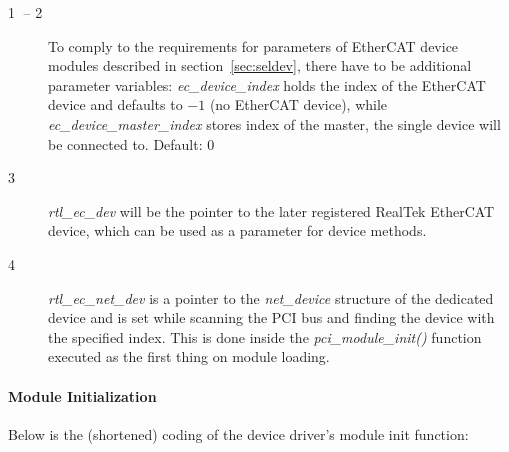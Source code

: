 \documentclass[a4paper,12pt,BCOR6mm,bibtotoc,idxtotoc]{scrbook}
\newcommand{\linenum}[1]{\normalfont\textcircled{\tiny #1}}
\begin{document}
\begin{description}
\item[\linenum{1} -- \linenum{2}] To
  comply to the requirements for parameters of EtherCAT device modules
  described in section~\ref{sec:seldev}, there have to be additional
  parameter variables: \textit{ec\_\-device\_\-index} holds the index
  of the EtherCAT device and defaults to $-1$ (no EtherCAT device),
  while \textit{ec\_device\_master\_index} stores index of the master,
  the single device will be connected to. Default: $0$
\item[\linenum{3}] \textit{rtl\_ec\_dev} will be
  the pointer to the later registered RealTek EtherCAT device, which
  can be used as a parameter for device methods.
\item[\linenum{4}] \textit{rtl\_ec\_net\_dev} is
  a pointer to the \textit{net\_device} structure of the dedicated
  device and is set while scanning the PCI bus and finding the device
  with the specified index. This is done inside the
  \textit{pci\_module\_init()} function executed as the first thing on
  module loading.
\end{description}

\paragraph{Module Initialization}

Below is the (shortened) coding of the device driver's module init
function:
\end{document}
